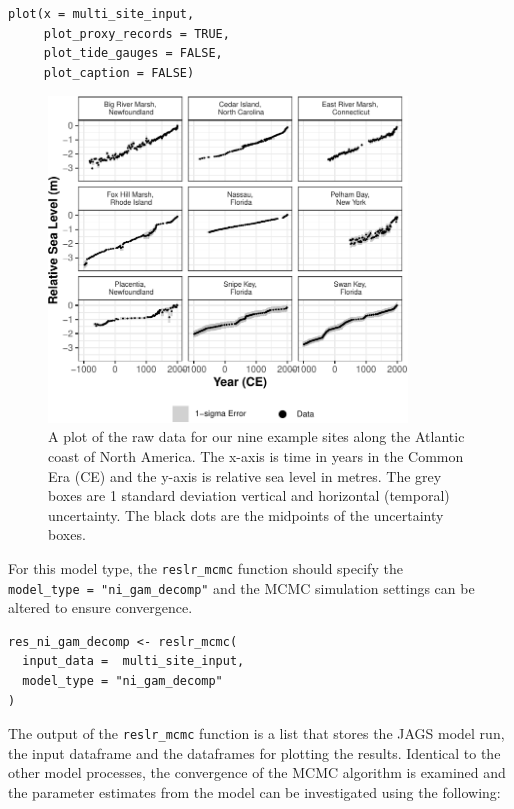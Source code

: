 \begin{verbatim}
plot(x = multi_site_input,
     plot_proxy_records = TRUE,
     plot_tide_gauges = FALSE,
     plot_caption = FALSE)
\end{verbatim}

\begin{figure}

{\centering \includegraphics[width=360px]{reslr_files/figure-latex/plotdatamulti-1} 

}

\caption{A plot of the raw data for our nine example sites along the Atlantic coast of North America. The x-axis is time in years in the Common Era (CE) and the y-axis is relative sea level in metres. The grey boxes are 1 standard deviation vertical and horizontal (temporal) uncertainty. The black dots are the midpoints of the uncertainty boxes.}\label{fig:plotdatamulti}
\end{figure}
\normalsize

For this model type, the \texttt{reslr\_mcmc} function should specify the \texttt{model\_type\ =\ "ni\_gam\_decomp"} and the MCMC simulation settings can be altered to ensure convergence.
\scriptsize

\begin{verbatim}
res_ni_gam_decomp <- reslr_mcmc(
  input_data =  multi_site_input,
  model_type = "ni_gam_decomp"
)
\end{verbatim}

\normalsize

The output of the \texttt{reslr\_mcmc} function is a list that stores the JAGS model run, the input dataframe and the dataframes for plotting the results. Identical to the other model processes, the convergence of the MCMC algorithm is examined and the parameter estimates from the model can be investigated using the following:
\scriptsize


